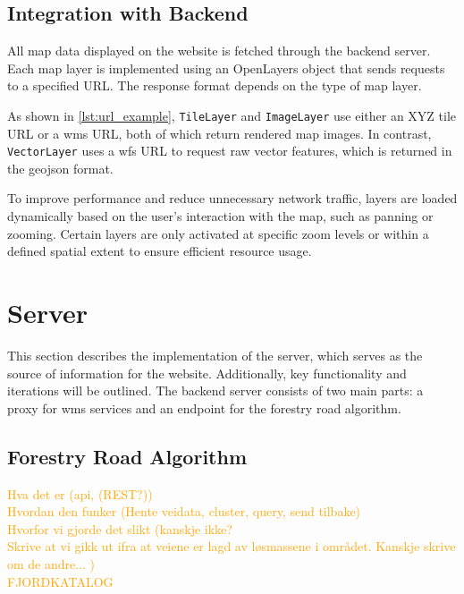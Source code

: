\subsection{Integration with Backend}

All map data displayed on the website is fetched through the backend server. Each map layer is implemented using an OpenLayers object that sends requests to a specified URL. The response format depends on the type of map layer.

As shown in \autoref{lst:url_example}, \texttt{TileLayer} and \texttt{ImageLayer} use either an XYZ tile URL or a \gls{wms} URL, both of which return rendered map images. In contrast, \texttt{VectorLayer} uses a \gls{wfs} URL to request raw vector features, which is returned in the \gls{geojson} format.

\begin{figure}[h]

\end{figure}

To improve performance and reduce unnecessary network traffic, layers are loaded dynamically based on the user's interaction with the map, such as panning or zooming. Certain layers are only activated at specific zoom levels or within a defined spatial extent to ensure efficient resource usage.

\section{Server}\label{sec:implementation:server}

This section describes the implementation of the server, which serves as the source of information for the website. Additionally, key functionality and iterations will be outlined. The backend server consists of two main parts: a proxy for \Gls{wms} services and an endpoint for the forestry road algorithm. 

\subsection{Forestry Road Algorithm}\label{subsec:server:forestroadalgorithm}

\textcolor{orange}{
Hva det er (api, (REST?)) \\
Hvordan den funker (Hente veidata, cluster, query, send tilbake) \\
Hvorfor vi gjorde det slikt (kanskje ikke? \\
Skrive at vi gikk ut ifra at veiene er lagd av løsmassene i området. Kanskje skrive om de andre... 
) \\
FJORDKATALOG
}

